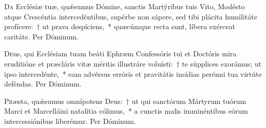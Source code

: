 \documentclass[vesperale_romanum.tex]{subfiles}
\begin{document}
\hicvir

\commsequentis
\myrule



\oratio

\lettrine{D}{a} Ecclésiæ tuæ, quǽsumus Dómine, sanctis Martýribus tuis Vito, Modésto atque Crescéntia intercedéntibus, supérbe non sápere, sed tibi plácita humilitáte profícere:~† ut prava despíciens,~* quæcúmque recta sunt, líbera exérceat caritáte. Per Dóminum.

\myrule



\duplex

\odoctoroptime

\oratio

\lettrine{D}{e}us, qui Ecclésiam tuam beáti Ephræm Confessóris tui et Doctóris mira eruditióne et præcláris vitæ méritis illustráre voluísti:~† te súpplices exorámus; ut ipso intercedénte,~* eam advérsus erróris et pravitátis insídias perénni tua virtúte deféndas.
Per Dóminum.


\oratio

\lettrine{P}{r}æsta, quǽsumus omnípotens Deus:~† ut qui sanctórum Mártyrum tuórum Marci et Marcelláini natalítia cólimus,~* a cunctis malis imminéntibus eórum intercessiónibus liberémur. Per Dóminum.


\myrule
\end{document}
